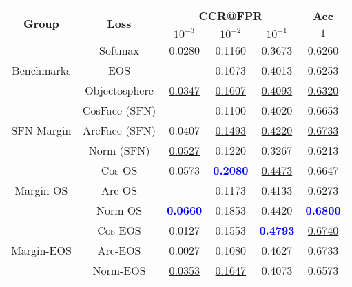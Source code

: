 \begin{tabularx}{.7\textwidth}{|c|c||ccc|c|}
\hline
\multirow{2}{*}{\bf Group} & \multirow{2}{*}{\bf Loss} & \multicolumn{3}{c|}{\bf CCR@FPR} & \bf {Acc} \\ \cline{3-6}
& &$10^{-3}$ & $10^{-2}$ & $10^{-1}$ & $1$\\\hline\hline
\multirow{3}{*}{Benchmarks} & Softmax & 0.0280 & 0.1160 & 0.3673 & 0.6260\\
 & EOS & & 0.1073 & 0.4013 & 0.6253\\
 & Objectosphere & \underline {0.0347} & \underline {0.1607} & \underline {0.4093} & \underline {0.6320}\\
\hline
\multirow{3}{*}{SFN Margin} & CosFace (SFN) & & 0.1100 & 0.4020 & 0.6653\\
 & ArcFace (SFN) & 0.0407 & \underline {0.1493} & \underline {0.4220} & \underline {0.6733}\\
 & Norm (SFN) & \underline {0.0527} & 0.1220 & 0.3267 & 0.6213\\
\hline
\multirow{3}{*}{Margin-OS} & Cos-OS & 0.0573 & \textcolor{blue}{\bf 0.2080} & \underline {0.4473} & 0.6647\\
 & Arc-OS & & 0.1173 & 0.4133 & 0.6273\\
 & Norm-OS & \textcolor{blue}{\bf 0.0660} & 0.1853 & 0.4420 & \textcolor{blue}{\bf 0.6800}\\
\hline
\multirow{3}{*}{Margin-EOS} & Cos-EOS & 0.0127 & 0.1553 & \textcolor{blue}{\bf 0.4793} & \underline {0.6740}\\
 & Arc-EOS & 0.0027 & 0.1080 & 0.4627 & 0.6733\\
 & Norm-EOS & \underline {0.0353} & \underline {0.1647} & 0.4073 & 0.6573\\
\hline
\end{tabularx}
